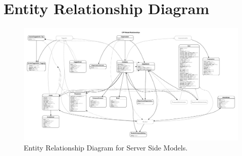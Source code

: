 \section{Entity Relationship Diagram}    
\begin{figure}[H]\centering
\includegraphics[scale=0.3, angle=90]{images/appendix/erd.pdf}
\caption{Entity Relationship Diagram for Server Side Models.}
\end{figure}